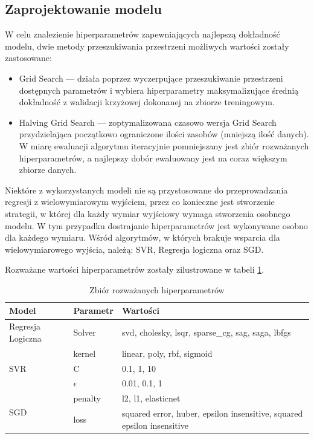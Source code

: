\subsection{Zaprojektowanie modelu}

W celu znalezienie hiperparametrów zapewniających najlepszą dokładność modelu,
dwie metody przeszukiwania przestrzeni możliwych wartości zostały zastosowane:

\begin{itemize}
    \item Grid Search — działa poprzez wyczerpujące przeszukiwanie 
    przestrzeni dostępnych parametrów i wybiera hiperparametry maksymalizujące
    średnią dokładność z walidacji krzyżowej dokonanej na zbiorze treningowym.
    \item Halving Grid Search — zoptymalizowana czasowo wersja Grid Search
    przydzielająca początkowo ograniczone ilości zasobów (mniejszą ilość
    danych). W miarę ewaluacji algorytmu iteracyjnie pomniejszany jest zbiór
    rozważanych hiperparametrów, a najlepszy dobór ewaluowany jest na coraz większym
    zbiorze danych.
\end{itemize}

Niektóre z wykorzystanych modeli nie są przystosowane do przeprowadzania 
regresji z wielowymiarowym wyjściem, przez co konieczne jest stworzenie strategii,
w której dla każdy wymiar wyjściowy wymaga stworzenia osobnego modelu. W tym przypadku
dostrajanie hiperparametrów jest wykonywane osobno dla każdego wymiaru. Wśród
algorytmów, w których brakuje wsparcia dla wielowymiarowego wyjścia, należą: 
SVR, Regresja logiczna oraz SGD.

Rozważane wartości hiperparametrów zostały zilustrowane w tabeli \ref{hiperparametry}.

\begin{table}[H]
    \centering
    \caption{Zbiór rozważanych hiperparametrów} \label{hiperparametry}
    \bigskip
    \begin{tabular}{|p{4cm}|p{4cm}|p{4cm}|}
    \hline
    Model & Parametr & Wartości \\
    \hline
    Regresja Logiczna & Solver & svd, cholesky, lsqr, sparse\_cg, sag, saga, lbfgs \\
    \hline
    \multirow{3}{*}{SVR} & kernel & linear, poly, rbf, sigmoid\\
    \cline{2-3}
     & C & 0.1, 1, 10\\
    \cline{2-3}
        & $\epsilon$ & 0.01, 0.1, 1\\
    \hline
    \multirow{3}{*}{SGD} & penalty & l2, l1, elasticnet\\
    \cline{2-3}
     & loss & squared error, huber, epsilon insensitive, squared epsilon insensitive\\
    \hline
\end{tabular}
\end{table}

